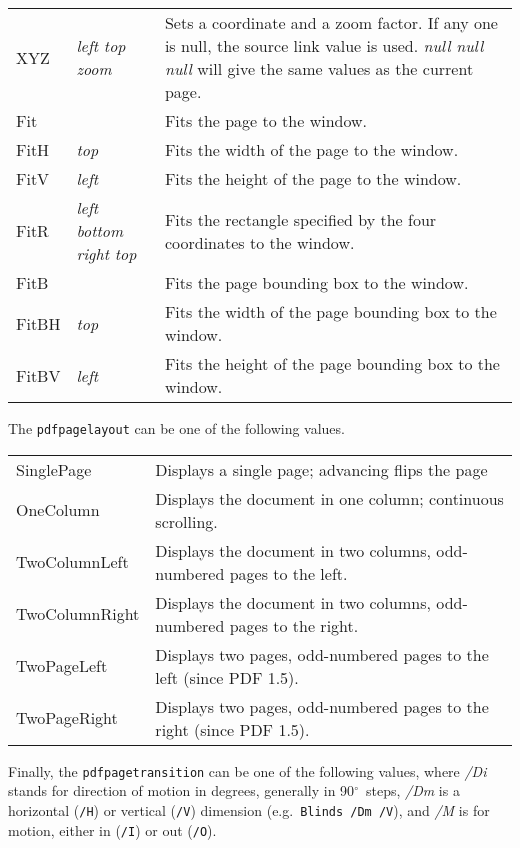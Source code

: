 \documentclass{article}
\begin{document}
\begin{longtable}{@{}>{\ttfamily}l>{\itshape}lp{7cm}@{}}
XYZ   & left top zoom         & Sets a coordinate and a zoom factor. If any one is null, the source link value is used.
                                \textit{null null null} will give the same values as the current page. \\
Fit   &                       & Fits the page to the window. \\
FitH  & top                   & Fits the width of the page to the window. \\
FitV  & left                  & Fits the height of the page to the window. \\
FitR  & left bottom right top & Fits the rectangle specified by the four coordinates to the window. \\
FitB  &                       & Fits the page bounding box to the window. \\
FitBH & top                   & Fits the width of the page bounding box to the window. \\
FitBV & left                  & Fits the height of the page bounding box to the window. \\
\end{longtable}

The \texttt{pdfpagelayout} can be one of the following values.

\begin{longtable}{@{}>{\ttfamily}lp{10cm}@{}}
SinglePage     & Displays a single page; advancing flips the page \\
OneColumn      & Displays the document in one column; continuous scrolling. \\
TwoColumnLeft  & Displays the document in two columns, odd-numbered pages to the left. \\
TwoColumnRight & Displays the document in two columns, odd-numbered pages to the right.\\
TwoPageLeft    & Displays two pages, odd-numbered pages to the left (since PDF 1.5).\\
TwoPageRight   & Displays two pages, odd-numbered pages to the right (since PDF 1.5).
\end{longtable}

Finally, the \texttt{pdfpagetransition} can be one of the following
values, where \textit{/Di} stands for direction of motion in degrees,
generally in 90$^{\circ}$\ steps, \textit{/Dm} is a horizontal
(\texttt{/H}) or vertical (\texttt{/V}) dimension (e.g.\ \texttt{Blinds
/Dm /V}), and \textit{/M} is for motion, either in (\texttt{/I}) or out
(\texttt{/O}).
\end{document}
